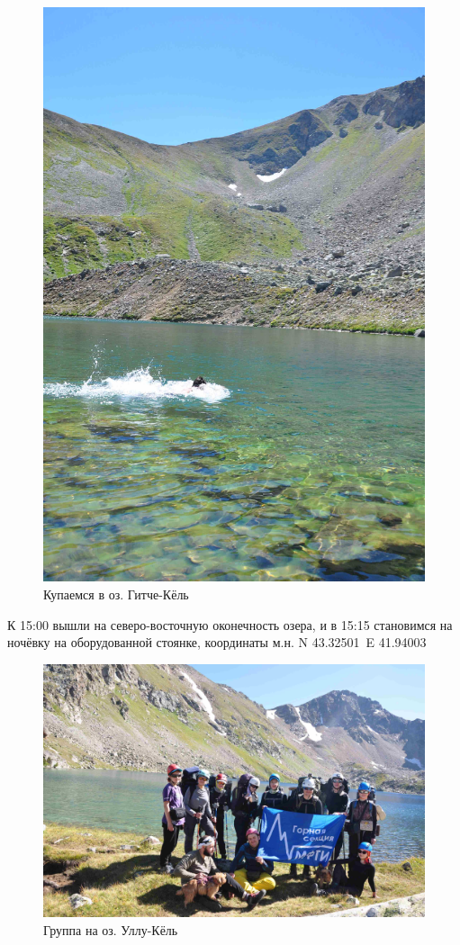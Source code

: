 \begin{figure}[h!]
	\centering
	\begin{turn}{0}
		\includegraphics[width=0.7\linewidth]{../pics/DSC_0774}
	\end{turn}
	\caption{Купаемся в оз. Гитче-Кёль}
	\label{fig:DSC_0774}
\end{figure}

К 15:00 вышли на северо-восточную оконечность озера, и в 15:15 становимся на ночёвку на оборудованной стоянке, координаты м.н. N 43.32501\degree~E 41.94003\degree

\begin{figure}[h!]
	\centering
	\includegraphics[width=0.7\linewidth]{../pics/DSC_0800}
	\caption{Группа на оз. Уллу-Кёль}
	\label{fig:DSC_0800}
\end{figure}


